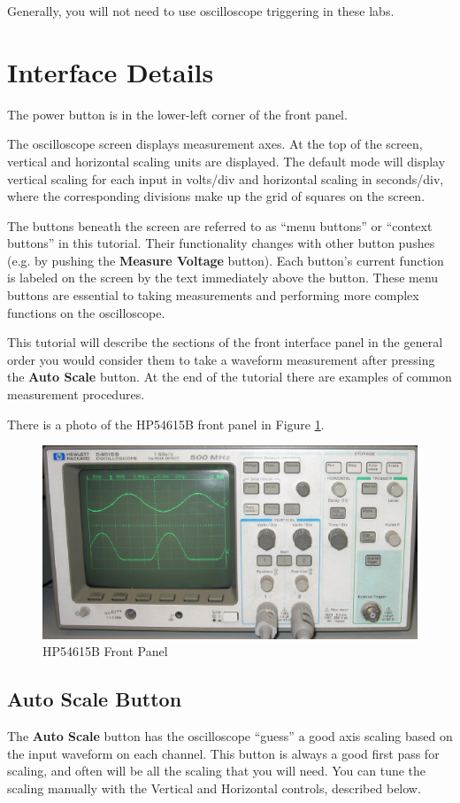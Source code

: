 \documentclass{article}
\begin{document}
Generally, you will not need to use oscilloscope triggering in these labs.

\section{Interface Details}
The power button is in the lower-left corner of the front panel. 

The oscilloscope screen displays measurement axes. At the top of the screen, vertical and horizontal scaling units are displayed. The default mode will display vertical scaling for each input in volts/div and horizontal scaling in seconds/div, where the corresponding divisions make up the grid of squares on the screen.

The buttons beneath the screen are referred to as ``menu buttons'' or ``context buttons'' in this tutorial. Their functionality changes with other button pushes (e.g. by pushing the \textbf{Measure Voltage} button). Each button's current function is labeled on the screen by the text immediately above the button. These menu buttons are essential to taking measurements and performing more complex functions on the oscilloscope.

This tutorial will describe the sections of the front interface panel in the general order you would consider them to take a waveform measurement after pressing the \textbf{Auto Scale} button. At the end of the tutorial there are examples of common measurement procedures.

There is a photo of the HP54615B front panel in Figure \ref{frontpanel}.

\begin{figure}[!htb]
  \centering
  \includegraphics{HP54615B.eps}
  \caption{HP54615B Front Panel}
  \label{frontpanel}
\end{figure}

\subsection{Auto Scale Button}
The \textbf{Auto Scale} button has the oscilloscope ``guess'' a good axis scaling based on the input waveform on each channel. This button is always a good first pass for scaling, and often will be all the scaling that you will need. You can tune the scaling manually with the Vertical and Horizontal controls, described below.
\end{document}
